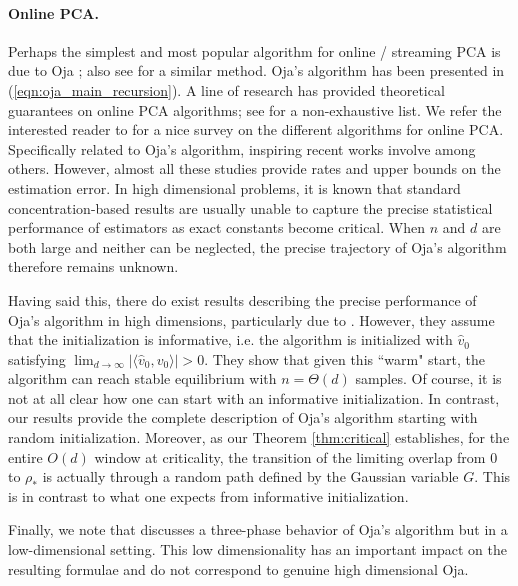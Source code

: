 \documentclass[12pt]{article}
\begin{document}
\paragraph{Online PCA.} Perhaps the simplest and most popular algorithm for online / streaming PCA is due to Oja \citep{oja1982simplified,oja1985stochastic}; also see \citet{krasulina1970method} for a similar method. Oja's algorithm has been presented in (\ref{eqn:oja_main_recursion}). A line of research has provided theoretical guarantees on online PCA algorithms; see \citet{warmuth2008randomized,boutsidis2014online,jain2016streaming,nie2016online,henriksen2019adaoja} for a non-exhaustive list. We refer the interested reader to \citet{cardot2018online} for a nice survey on the different algorithms for online PCA. Specifically related to Oja's algorithm, inspiring recent works involve \cite{lunde2021bootstrapping,kumar2023streaming,kumar2025beyond,pham2025time} among others. However, almost all these studies provide rates and upper bounds on the estimation error. In high dimensional problems, it is known that standard concentration-based results are usually unable to capture the precise statistical performance of estimators as exact constants become critical. When $n$ and $d$ are both large and neither can be neglected, the precise trajectory of Oja's algorithm therefore remains unknown. 

Having said this, there do exist results describing the precise performance of Oja's algorithm in high dimensions, particularly due to \citet{wang2016online,wang2017scaling}. However, they assume that the initialization is informative, i.e. the algorithm is initialized with $\hat v_0$ satisfying $\lim_{d\to\infty}|\langle \hat v_0,v_0\rangle|>0$. They show that given this ``warm" start, the algorithm can reach stable equilibrium with $n=\Theta(d)$ samples. Of course, it is not at all clear how one can start with an informative initialization. In contrast, our results provide the complete description of Oja's algorithm starting with random initialization. Moreover, as our Theorem \ref{thm:critical} establishes, for the entire $O(d)$ window at criticality, the transition of the limiting overlap from $0$ to $\rho_*$ is actually through a random path defined by the Gaussian variable $G$. This is in contrast to what one expects from informative initialization. 

Finally, we note that \citet{li2017diffusion} discusses a three-phase behavior of Oja's algorithm but in a low-dimensional setting. This low dimensionality has an important impact on the resulting formulae and do not correspond to genuine high dimensional Oja.
\end{document}

